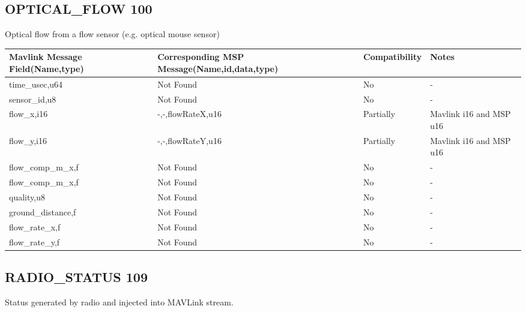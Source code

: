 

\subsection{OPTICAL\_FLOW 100} 
Optical flow from a flow sensor (e.g. optical mouse sensor)\\

{
\centering
\begin{tabular}{ |p{4cm  } |p{7cm} | p{2cm}|m{5em}|}
\hline
Mavlink Message Field(Name,type)&Corresponding MSP Message(Name,id,data,type)& Compatibility & Notes\\
\hline
time\_usec,u64 & Not Found & No & - \\
\hline
sensor\_id,u8 & Not Found & No & -\\
\hline
\rowcolor{lightgray}
flow\_x,i16 & -,-,flowRateX,u16 & Partially & Mavlink i16 and MSP u16 \\
\hline
\rowcolor{lightgray}
flow\_y,i16&  -,-,flowRateY,u16& Partially & Mavlink i16 and MSP u16 \\
\hline
flow\_comp\_m\_x,f & Not Found & No & -\\
\hline
flow\_comp\_m\_x,f  & Not Found & No & - \\
\hline
quality,u8 &Not Found& No & - \\
\hline
ground\_distance,f & Not Found & No & - \\
\hline
flow\_rate\_x,f & Not Found& No & - \\
\hline
flow\_rate\_y,f & Not Found& No & - \\



\end{tabular}
}

\cleardoublepage




\subsection{RADIO\_STATUS 109} 
Status generated by radio and injected into MAVLink stream.\\

